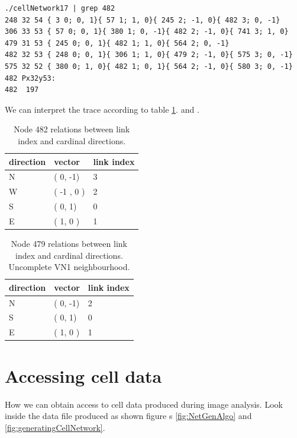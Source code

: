 \begin{lstlisting}
./cellNetwork17 | grep 482
248 32 54 { 3 0; 0, 1}{ 57 1; 1, 0}{ 245 2; -1, 0}{ 482 3; 0, -1}
306 33 53 { 57 0; 0, 1}{ 380 1; 0, -1}{ 482 2; -1, 0}{ 741 3; 1, 0}
479 31 53 { 245 0; 0, 1}{ 482 1; 1, 0}{ 564 2; 0, -1}
482 32 53 { 248 0; 0, 1}{ 306 1; 1, 0}{ 479 2; -1, 0}{ 575 3; 0, -1}
575 32 52 { 380 0; 1, 0}{ 482 1; 0, 1}{ 564 2; -1, 0}{ 580 3; 0, -1}
482 Px32y53:
482  197
\end{lstlisting}

We can interpret the trace according to table \ref{tab:cardialAndIndex}. and \label{tab:cardialAndIndex479}.
\begin{table}[htb]
\begin{center}
\begin{tabular}{|l|l|l|}\hline
direction & vector & link index \\\hline
N  &  ( 0, -1) &   3 \\\hline
W  &   ( -1 ,  0 ) &   2  \\\hline
S  &  ( 0, 1) & 0   \\\hline
E  &  ( 1, 0 ) &   1 \\\hline
\end{tabular}
\caption{Node 482 relations between link index and cardinal directions. }
\label{tab:cardialAndIndex}
\end{center}
\end{table}


\begin{table}[htb]
\begin{center}
\begin{tabular}{|l|l|l|}\hline
direction & vector & link index \\\hline
N  &  ( 0, -1) &   2 \\\hline 
S  &  ( 0, 1) & 0   \\\hline
E  &  ( 1, 0 ) &   1 \\\hline
\end{tabular}
\caption{Node 479 relations between link index and cardinal directions. Uncomplete VN1 neighbourhood. }
\label{tab:cardialAndIndex479}
\end{center}
\end{table}




\section { Accessing cell data}

How we can obtain access to cell data produced during image analysis. Look inside
the data file produced as shown figure s \ref{fig:NetGenAlgo} and \ref{fig:generatingCellNetwork}.


